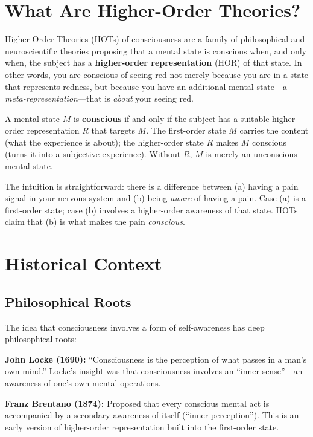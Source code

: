 \documentclass[11pt,a4paper]{report}
\begin{document}
\section{What Are Higher-Order Theories?}

Higher-Order Theories (HOTs) of consciousness are a family of philosophical and neuroscientific theories proposing that a mental state is conscious when, and only when, the subject has a \textbf{higher-order representation} (HOR) of that state. In other words, you are conscious of seeing red not merely because you are in a state that represents redness, but because you have an additional mental state---a \emph{meta-representation}---that is \emph{about} your seeing red.

\begin{definitionbox}
A mental state $M$ is \textbf{conscious} if and only if the subject has a suitable higher-order representation $R$ that targets $M$. The first-order state $M$ carries the content (what the experience is about); the higher-order state $R$ makes $M$ conscious (turns it into a subjective experience). Without $R$, $M$ is merely an unconscious mental state.
\end{definitionbox}

The intuition is straightforward: there is a difference between (a) having a pain signal in your nervous system and (b) being \emph{aware} of having a pain. Case (a) is a first-order state; case (b) involves a higher-order awareness of that state. HOTs claim that (b) is what makes the pain \emph{conscious}.

\section{Historical Context}

\subsection{Philosophical Roots}

The idea that consciousness involves a form of self-awareness has deep philosophical roots:

\textbf{John Locke (1690):} ``Consciousness is the perception of what passes in a man's own mind.'' Locke's insight was that consciousness involves an ``inner sense''---an awareness of one's own mental operations.

\textbf{Franz Brentano (1874):} Proposed that every conscious mental act is accompanied by a secondary awareness of itself (``inner perception''). This is an early version of higher-order representation built into the first-order state.
\end{document}
